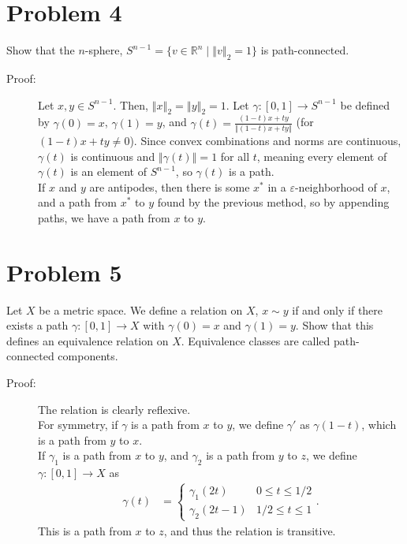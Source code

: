 \documentclass[8pt]{extarticle}
\newcommand{\R}{\mathbb{R}}
\newcommand{\norm}[1]{\left\Vert #1\right\Vert}
\begin{document}
  \section{Problem 4}%
  Show that the $n$-sphere, $S^{n-1} = \{v\in \R^n\mid \norm{v}_2 = 1\}$ is path-connected.
  \begin{description}
    \item[Proof:] Let $x,y\in S^{n-1}$. Then, $\norm{x}_{2} = \norm{y}_{2} = 1$. Let $\gamma: [0,1]\rightarrow S^{n-1}$ be defined by $\gamma(0) = x$, $\gamma(1) = y$, and $\gamma(t) = \frac{(1-t)x + ty}{\norm{(1-t)x + ty}}$ (for $(1-t)x + ty \neq 0$). Since convex combinations and norms are continuous, $\gamma(t)$ is continuous and $\norm{\gamma(t)} = 1$ for all $t$, meaning every element of $\gamma(t)$ is an element of $S^{n-1}$, so $\gamma(t)$ is a path.\\

      If $x$ and $y$ are antipodes, then there is some $x^{\ast}$ in a $\varepsilon$-neighborhood of $x$, and a path from $x^{\ast}$ to $y$ found by the previous method, so by appending paths, we have a path from $x$ to $y$.
  \end{description}
  \section{Problem 5}%
  Let $X$ be a metric space. We define a relation on $X$, $x\sim y$ if and only if there exists a path $\gamma: [0,1] \rightarrow X$ with $\gamma(0) = x$ and $\gamma(1) = y$. Show that this defines an equivalence relation on $X$. Equivalence classes are called path-connected components.
  \begin{description}
    \item[Proof:] The relation is clearly reflexive.\\

      For symmetry, if $\gamma$ is a path from $x$ to $y$, we define $\gamma'$ as $\gamma(1-t)$, which is a path from $y$ to $x$.\\

      If $\gamma_1$ is a path from $x$ to $y$, and $\gamma_2$ is a path from $y$ to $z$, we define $\gamma: [0,1]\rightarrow X$ as
      \begin{align*}
        \gamma(t) &= \begin{cases}
          \gamma_1(2t) & 0 \leq t \leq 1/2\\
          \gamma_2(2t - 1) & 1/2 \leq t \leq 1
        \end{cases}.
      \end{align*}
      This is a path from $x$ to $z$, and thus the relation is transitive.
  \end{description}
\end{document}
